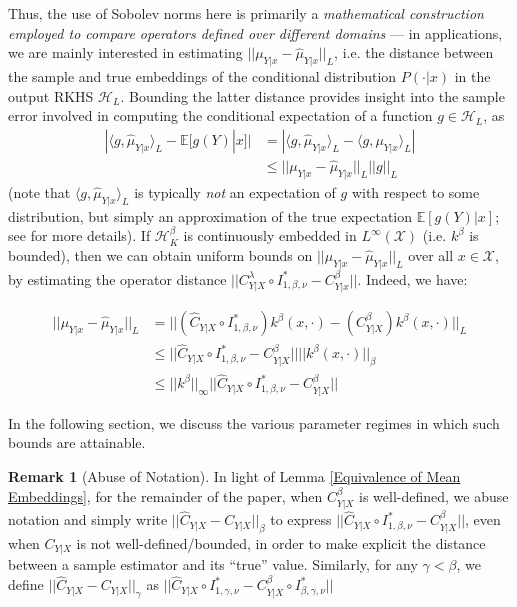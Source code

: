 \documentclass[accepted]{article}
\theoremstyle{definition}
\newtheorem*{remark}{Remark}
\begin{document}
Thus, the use of Sobolev norms here is primarily a \textit{mathematical construction employed to compare operators defined over different domains} --- in applications, we are mainly interested in estimating $||\mu_{Y|x} - \hat{\mu}_{Y|x}||_{L}$, i.e. the distance between the sample and true embeddings of the conditional distribution $P(\cdot | x)$ in the output RKHS $\mathcal{H}_L$. Bounding the latter distance provides insight into the sample error involved in computing the conditional expectation of a function $g \in \mathcal{H}_L$, as 
\begin{align*}
    |\langle g, \hat{\mu}_{Y|x} \rangle_L - \mathbb{E}[g(Y)|x]| & = |\langle g, \hat{\mu}_{Y|x} \rangle_L -  \langle g, \mu_{Y|x} \rangle_L| \\
    & \leq ||\mu_{Y|x} - \hat{\mu}_{Y|x}||_{L}||g||_{L}
\end{align*}
(note that $\langle g, \hat{\mu}_{Y|x} \rangle_L$ is typically \textit{not} an expectation of $g$ with respect to some distribution, but simply an approximation of the true expectation $\mathbb{E}[g(Y)|x]$; see \cite{grunewalder2012modelling} for more details). If $\mathcal{H}^{\beta}_{K}$ is continuously embedded in $L^{\infty}(\mathcal{X})$ (i.e. $k^{\beta}$ is bounded), then we can obtain uniform bounds on $||\mu_{Y|x} - \hat{\mu}_{Y|x}||_{L}$ over all $x \in \mathcal{X}$, by estimating the operator distance $||C^{\lambda}_{Y|X} \circ I^{*}_{1, \beta, \nu} - C^{\beta}_{Y|x}||$. Indeed, we have:
\begin{small}
\begin{align*}
    ||\mu_{Y|x} - \hat{\mu}_{Y|x}||_{L} & = ||(\hat{C}_{Y|X} \circ I^{*}_{1, \beta, \nu})k^{\beta}(x, \cdot) - (C^{\beta}_{Y | X})k^{\beta}(x, \cdot)||_{L} \\
    & \leq ||\hat{C}_{Y|X} \circ I^{*}_{1, \beta, \nu} - C^{\beta}_{Y | X}|| ||k^{\beta}(x, \cdot)||_{\beta} \\
    & \leq ||k^{\beta}||_{\infty}||\hat{C}_{Y|X} \circ I^{*}_{1, \beta, \nu} - C^{\beta}_{Y | X}||
\end{align*}
\end{small}
In the following section, we discuss the various parameter regimes in which such bounds are attainable. 

\begin{remark}[Abuse of Notation]
In light of Lemma \ref{Equivalence of Mean Embeddings}, for the remainder of the paper, when $C^{\beta}_{Y|X}$ is well-defined, we abuse notation and simply write $||\hat{C}_{Y|X}  - C_{Y | X}||_{\beta}$ to express $||\hat{C}_{Y|X} \circ I^{*}_{1, \beta, \nu} - C^{\beta}_{Y | X}||$, even when $C_{Y | X}$ is not well-defined/bounded, in order to make explicit the distance between a sample estimator and its ``true'' value. Similarly, for any $\gamma < \beta$, we define $||\hat{C}_{Y|X} - C_{Y|X}||_{\gamma}$ as $||\hat{C}_{Y|X} \circ I^{*}_{1, \gamma, \nu} - C^{\beta}_{Y|X} \circ I^{*}_{\beta, \gamma, \nu}||$
\end{remark} 
\end{document}
